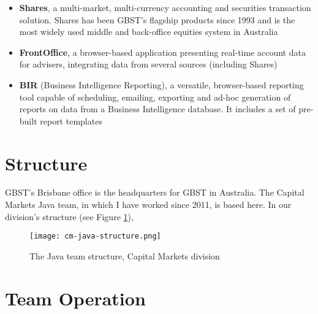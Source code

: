 \begin{itemize}
\item \textbf{Shares}, a multi-market, multi-currency accounting and securities transaction solution. Shares has been GBST's flagship products since 1993 and is the most widely used middle and back-office equities system in Australia \cite{gbstshares}
\item \textbf{FrontOffice}, a browser-based application presenting real-time account data for advisers, integrating data from several sources (including Shares) \cite{gbstfrontoffice}
\item \textbf{BIR} (Business Intelligence Reporting), a versatile, browser-based reporting tool capable of scheduling, emailing, exporting and ad-hoc generation of reports on data from a Business Intelligence database. \cite{gbstbir} It includes a set of pre-built report templates 
\end{itemize}

\section{Structure}

GBST's Brisbane office is the headquarters for GBST in Australia. The Capital Markets Java team, in which I have worked since 2011, is based here. In our division's structure (see Figure \ref{cm_java_structure}),

\vspace{0.5cm}
\begin{figure}[ht!]
\centering
\texttt{[image: cm-java-structure.png]}
\caption{The Java team structure, Capital Markets division}
\label{cm_java_structure}
\end{figure}

\section{Team Operation}

\begin{comment}

lorem ipsum blah blah blah

Figure \ref{gbstlogo} in text

Citing \cite{gbstlogo} in text

\vspace{0.5cm}
\begin{figure}[ht!]
\centering
\texttt{[image: GBSTlogo.png]}
\caption{The GBST Logo \cite{gbstlogo}}
\label{gbstlogo}
\end{figure}

\end{comment}

\begin{comment}
\texttt{[image: GBSTlogo.png]}
\end{comment}
